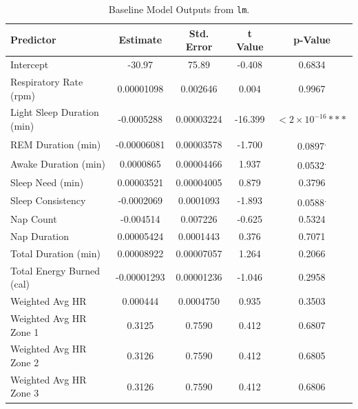 \documentclass{article}
\begin{document}
\begin{table}[h!]
\centering
\caption{Baseline Model Outputs from \texttt{lm}.}
\begin{tabular}{lcccc}
\hline
\textbf{Predictor}              & \textbf{Estimate}   & \textbf{Std. Error} & \textbf{t Value} & \textbf{p-Value} \\ \hline
Intercept                       & -30.97              & 75.89               & -0.408           & 0.6834           \\
Respiratory Rate (rpm)          & 0.00001098          & 0.002646            & 0.004            & 0.9967           \\
Light Sleep Duration (min)      & -0.0005288          & 0.00003224          & -16.399          & $<2 \times 10^{-16}***$ \\
REM Duration (min)              & -0.00006081         & 0.00003578          & -1.700           & 0.0897\textsuperscript{.} \\
Awake Duration (min)            & 0.0000865           & 0.00004466          & 1.937            & 0.0532\textsuperscript{.} \\
Sleep Need (min)                & 0.00003521          & 0.00004005          & 0.879            & 0.3796           \\
Sleep Consistency               & -0.0002069          & 0.0001093           & -1.893           & 0.0588\textsuperscript{.} \\
Nap Count                       & -0.004514           & 0.007226            & -0.625           & 0.5324           \\
Nap Duration                    & 0.00005424          & 0.0001443           & 0.376            & 0.7071           \\
Total Duration (min)            & 0.00008922          & 0.00007057          & 1.264            & 0.2066           \\
Total Energy Burned (cal)       & -0.00001293         & 0.00001236          & -1.046           & 0.2958           \\
Weighted Avg HR                 & 0.000444           & 0.0004750           & 0.935            & 0.3503           \\
Weighted Avg HR Zone 1          & 0.3125              & 0.7590              & 0.412            & 0.6807           \\
Weighted Avg HR Zone 2          & 0.3126              & 0.7590              & 0.412            & 0.6805           \\
Weighted Avg HR Zone 3          & 0.3126              & 0.7590              & 0.412            & 0.6806           \\

\end{tabular}
\end{table}
\end{document}
